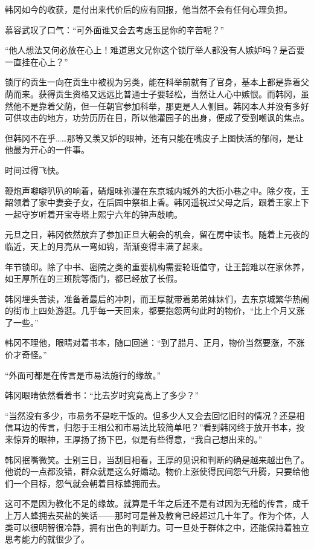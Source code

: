 韩冈如今的收获，是付出来代价后的应有回报，他当然不会有任何心理负担。

慕容武叹了口气：“可外面谁又会去考虑玉昆你的辛苦呢？”

“他人想法又何必放在心上！难道思文兄你这个锁厅举人都没有人嫉妒吗？是否要一直挂在心上？”

锁厅的贡生一向在贡生中被视为另类，能在科举前就有了官身，基本上都是靠着父荫而来。获得贡生资格又远远比普通士子要轻松，当然让人心中嫉恨。而韩冈，虽然他不是靠着父荫，但一任朝官参加科举，那更是人人侧目。韩冈本人并没有多好可供攻击的地方，功劳历历在目，所以他灌园子的出身，便成了受到嘲讽的焦点。

但韩冈不在乎……那等又羡又妒的眼神，还有只能在嘴皮子上图快活的郁闷，是让他最为开心的一件事。

时间过得飞快。

鞭炮声噼噼叭叭的响着，硝烟味弥漫在东京城内城外的大街小巷之中。除夕夜，王韶领着了家中妻妾子女，在后园中祭祖上香。韩冈遥祝过父母之后，跟着王家上下一起守岁听着开宝寺塔上熙宁六年的钟声敲响。

元旦之日，韩冈依然放弃了参加正旦大朝会的机会，留在房中读书。随着上元夜的临近，天上的月亮从一弯如钩，渐渐变得丰满了起来。

年节锁印。除了中书、密院之类的重要机构需要轮班值守，让王韶难以在家休养，如王厚所在的三班院等衙门，都已经放了长假。

韩冈埋头苦读，准备着最后的冲刺，而王厚就带着弟弟妹妹们，去东京城繁华热闹的街市上四处游逛。几乎每一天回来，都要抱怨两句此时的物价，“比上个月又涨了一些。”

韩冈不理他，眼睛对着书本，随口回道：“到了腊月、正月，物价当然要涨，不涨价才奇怪。”

“外面可都是在传言是市易法施行的缘故。”

韩冈眼睛依然看着书：“比去岁时究竟高上了多少？”

“当然没有多少，市易务不是吃干饭的。但多少人又会去回忆旧时的情况？还是相信耳边的传言，归怨于王相公和市易法比较简单吧？”看到韩冈终于放开书本，投来惊异的眼神，王厚扬了扬下巴，似是有些得意，“我自己想出来的。”

韩冈抿嘴微笑。士别三日，当刮目相看，王厚的见识和判断的确是越来越出色了。他说的一点都没错，群众就是这么好煽动。物价上涨使得民间怨气升腾，只要给他们一个目标，怨气就会朝着目标蜂拥而去。

这可不是因为教化不足的缘故。就算是千年之后还不是有过因为无稽的传言，成千上万人蜂拥去买盐的笑话——那时可是普及教育已经超过几十年了。作为个体，人类可以很明智很冷静，拥有出色的判断力。可一旦处于群体之中，还能保持着独立思考能力的就很少了。

